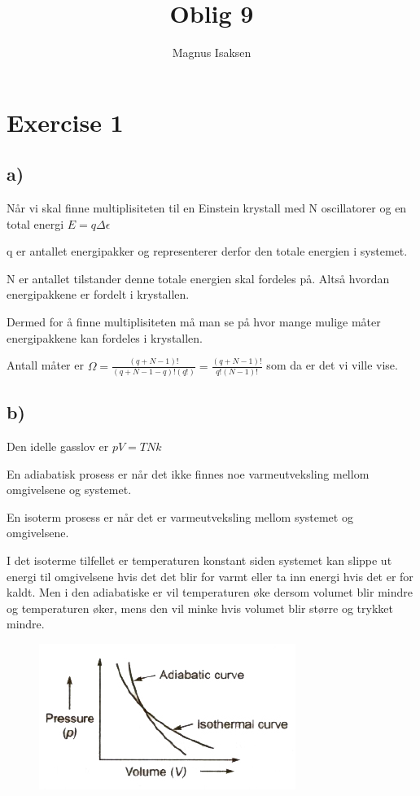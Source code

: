 \documentclass[14pt]{article}
\begin{document}
\title{Oblig 9}
\author{Magnus Isaksen}
\maketitle
\newpage 

\section*{Exercise 1}

\subsection*{a)}

Når vi skal finne multiplisiteten til en Einstein krystall med N oscillatorer og en total energi $E = q\Delta \epsilon$

q er antallet energipakker og representerer derfor den totale energien i systemet. 

N er antallet tilstander denne totale energien skal fordeles på. Altså hvordan energipakkene er fordelt i krystallen. 

Dermed for å finne multiplisiteten må man se på hvor mange mulige måter energipakkene kan fordeles i krystallen. 

Antall måter er $\Omega = \frac{(q+N-1)!}{(q+N-1-q)!(q!)} = \frac{(q+N-1)!}{q!(N-1)!}$ som da er det vi ville vise. 

\subsection*{b)}


Den idelle gasslov er $pV=TNk$ 

En adiabatisk prosess er når det ikke finnes noe varmeutveksling mellom omgivelsene og systemet. 

En isoterm prosess er når det er varmeutveksling mellom systemet og omgivelsene. 

I det isoterme tilfellet er temperaturen konstant siden systemet kan slippe ut energi til omgivelsene hvis det det blir for varmt eller ta inn energi hvis det er for kaldt. Men i den adiabatiske er vil temperaturen øke dersom volumet blir mindre og temperaturen øker, mens den vil minke hvis volumet blir større og trykket mindre. 

\newpage

\begin{figure}[ht!]
\includegraphics[width = \textwidth]{Graph_A.jpg}
\end{figure}
\end{document}
